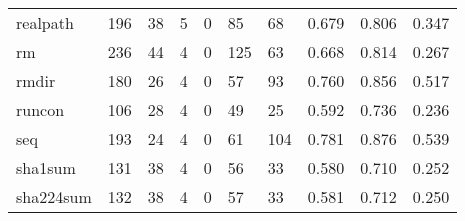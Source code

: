 \begin{longtable}{lp{2.0cm}p{2.0cm}p{2.0cm}p{2.0cm}p{2.0cm}p{2.0cm}p{2.0cm}p{2.0cm}p{2.0cm}}
realpath  &                    196 &                                 38 &                                 5 &                                0 &                                85 &                              68 &                                0.679 &                                  0.806 &                                0.347 \\
rm        &                    236 &                                 44 &                                 4 &                                0 &                               125 &                              63 &                                0.668 &                                  0.814 &                                0.267 \\
rmdir     &                    180 &                                 26 &                                 4 &                                0 &                                57 &                              93 &                                0.760 &                                  0.856 &                                0.517 \\
runcon    &                    106 &                                 28 &                                 4 &                                0 &                                49 &                              25 &                                0.592 &                                  0.736 &                                0.236 \\
seq       &                    193 &                                 24 &                                 4 &                                0 &                                61 &                             104 &                                0.781 &                                  0.876 &                                0.539 \\
sha1sum   &                    131 &                                 38 &                                 4 &                                0 &                                56 &                              33 &                                0.580 &                                  0.710 &                                0.252 \\
sha224sum &                    132 &                                 38 &                                 4 &                                0 &                                57 &                              33 &                                0.581 &                                  0.712 &                                0.250 \\

\end{longtable}
